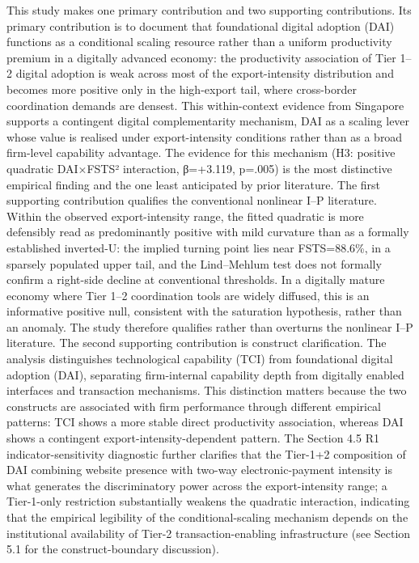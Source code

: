 \documentclass[
  12pt,a4paper]{article}
\begin{document}
This study makes one primary contribution and two supporting
contributions. Its primary contribution is to document that foundational
digital adoption (DAI) functions as a conditional scaling resource
rather than a uniform productivity premium in a digitally advanced
economy: the productivity association of Tier 1--2 digital adoption is
weak across most of the export-intensity distribution and becomes more
positive only in the high-export tail, where cross-border coordination
demands are densest. This within-context evidence from Singapore
supports a contingent digital complementarity mechanism, DAI as a
scaling lever whose value is realised under export-intensity conditions
rather than as a broad firm-level capability advantage. The evidence for
this mechanism (H3: positive quadratic DAI×FSTS² interaction, β=+3.119,
p=.005) is the most distinctive empirical finding and the one least
anticipated by prior literature. The first supporting contribution
qualifies the conventional nonlinear I--P literature. Within the
observed export-intensity range, the fitted quadratic is more defensibly
read as predominantly positive with mild curvature than as a formally
established inverted-U: the implied turning point lies near FSTS=88.6\%,
in a sparsely populated upper tail, and the Lind--Mehlum test does not
formally confirm a right-side decline at conventional thresholds. In a
digitally mature economy where Tier 1--2 coordination tools are widely
diffused, this is an informative positive null, consistent with the
saturation hypothesis, rather than an anomaly. The study therefore
qualifies rather than overturns the nonlinear I--P literature. The
second supporting contribution is construct clarification. The analysis
distinguishes technological capability (TCI) from foundational digital
adoption (DAI), separating firm-internal capability depth from digitally
enabled interfaces and transaction mechanisms. This distinction matters
because the two constructs are associated with firm performance through
different empirical patterns: TCI shows a more stable direct
productivity association, whereas DAI shows a contingent
export-intensity-dependent pattern. The Section 4.5 R1
indicator-sensitivity diagnostic further clarifies that the Tier-1+2
composition of DAI combining website presence with two-way
electronic-payment intensity is what generates the discriminatory power
across the export-intensity range; a Tier-1-only restriction
substantially weakens the quadratic interaction, indicating that the
empirical legibility of the conditional-scaling mechanism depends on the
institutional availability of Tier-2 transaction-enabling infrastructure
(see Section 5.1 for the construct-boundary discussion).
\end{document}
